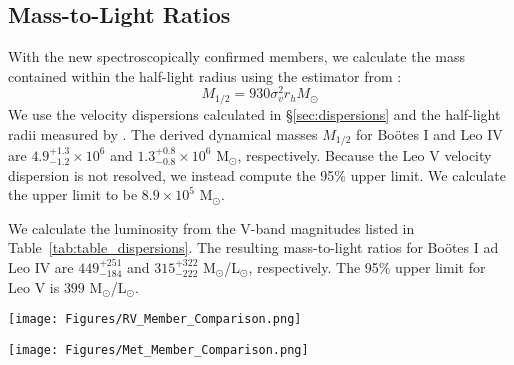 \documentclass[twocolumn]{aastex63}
\begin{document}
\subsection{Mass-to-Light Ratios}
\label{sec:ml_ratio}
With the new spectroscopically confirmed members, we calculate the mass contained within the half-light radius using the estimator from \citet{wol2010}:
\begin{equation}
M_{1/2} = 930\sigma_v^2 r_h M_\odot
\end{equation}
We use the velocity dispersions calculated in \S\ref{sec:dispersions} and the half-light radii measured by \citet{mun2018}. The derived dynamical masses $M_{1/2}$ for Bo{\"o}tes I and Leo IV are $4.9^{+1.3}_{-1.2} \times 10^6$ and $1.3^{+0.8}_{-0.8} \times 10^6$ M$_\odot$, respectively. Because the Leo V velocity dispersion is not resolved, we instead compute the 95\% upper limit. We calculate the upper limit to be $8.9\times 10^5$ M$_\odot$. 

We calculate the luminosity from the V-band magnitudes listed in Table~\ref{tab:table_dispersions}. The  resulting mass-to-light ratios for Bo{\"o}tes I ad Leo IV are $449^{+251}_{-184}$ and $315^{+322}_{-222}$ M$_\odot$/L$_\odot$, respectively. The 95\% upper limit for Leo V is $399$ M$_\odot$/L$_\odot$.
\begin{figure*}
\centering
\texttt{[image: Figures/RV\_Member\_Comparison.png]}
\caption{Comparison of Bo{\"o}tes I, Leo IV and Leo V member stars' radial velocity measurements with literature values, excluding binary and RR Lyrae stars. Because there is only one Leo V star (Leo5\_1038) in both the VLT data and \citet{mut2020} data with quality spectra, and this star is a binary (see Figure~\ref{1038}), we do not include a comparison with \citet{mut2020}. We do not observe a significant offset for either Bo{\"o}tes I or Leo IV. However, for Leo V, we observe a positive offset of 4.8 $\pm$ 2.9 km s$^{-1}$ from \citet{col2017} based on two common stars. 
\label{rv_comparison}
}
\end{figure*}
\begin{figure*}
\centering
\texttt{[image: Figures/Met\_Member\_Comparison.png]}
\caption{Comparison of Bo{\"o}tes I, Leo IV and Leo V member stars' metallicity measurements with literature values. \citet{mut2020} observe the same Leo V member star (Leo5\_1038) twice; we compare our metallicity to both of their measurements, which differ by 1.31$\pm$0.45 dex. This star is considered a binary (see Figure~\ref{1038}). \label{metallicity_comparison}}
\end{figure*}
\end{document}
